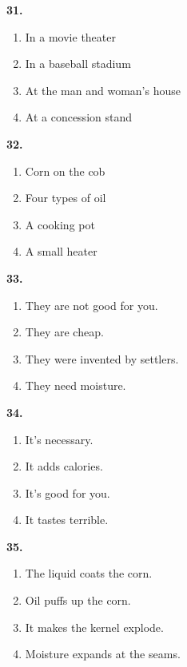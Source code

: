 \documentclass[12pt]{article}
\begin{document}
\noindent\textbf{31.}
\begin{enumerate}[label=(\Alph*),leftmargin=*,itemsep=0.2em]
\item In a movie theater
\item In a baseball stadium
\item At the man and woman's house
\item At a concession stand
\end{enumerate}
\par
\vspace{0.25\baselineskip}
\noindent\textbf{32.}
\begin{enumerate}[label=(\Alph*),leftmargin=*,itemsep=0.2em]
\item Corn on the cob
\item Four types of oil
\item A cooking pot
\item A small heater
\end{enumerate}
\par
\vspace{0.25\baselineskip}
\noindent\textbf{33.}
\begin{enumerate}[label=(\Alph*),leftmargin=*,itemsep=0.2em]
\item They are not good for you.
\item They are cheap.
\item They were invented by settlers.
\item They need moisture.
\end{enumerate}
\par
\vspace{0.25\baselineskip}
\noindent\textbf{34.}
\begin{enumerate}[label=(\Alph*),leftmargin=*,itemsep=0.2em]
\item It's necessary.
\item It adds calories.
\item It's good for you.
\item It tastes terrible.
\end{enumerate}
\par
\vspace{0.25\baselineskip}
\noindent\textbf{35.}
\begin{enumerate}[label=(\Alph*),leftmargin=*,itemsep=0.2em]
\item The liquid coats the corn.
\item Oil puffs up the corn.
\item It makes the kernel explode.
\item Moisture expands at the seams.
\end{enumerate}
\end{document}
